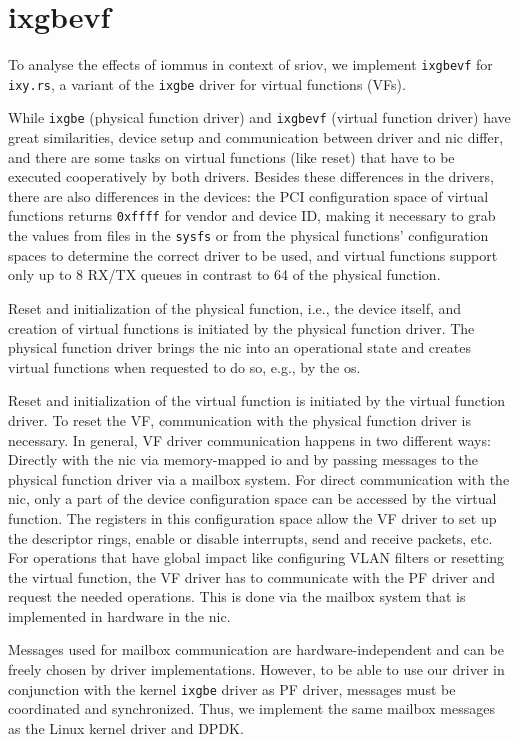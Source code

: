\section{ixgbevf}
\label{sec:ixgbevf}

To analyse the effects of \acp{iommu} in context of \ac{sriov}, we implement
\texttt{ixgbevf} for \texttt{ixy.rs}, a variant of the \texttt{ixgbe} driver for
virtual functions (VFs).

While \texttt{ixgbe} (physical function driver) and \texttt{ixgbevf} (virtual
function driver) have great similarities, device setup and communication between
driver and \ac{nic} differ, and there are some tasks on virtual functions (like
reset) that have to be executed cooperatively by both drivers. Besides these
differences in the drivers, there are also differences in the devices: the PCI
configuration space of virtual functions returns \texttt{0xffff} for vendor and
device ID, making it necessary to grab the values from files in the
\texttt{sysfs} or from the physical functions' configuration spaces to determine
the correct driver to be used, and virtual functions support only up to 8 RX/TX
queues in contrast to 64 of the physical function.

Reset and initialization of the physical function, i.e., the device itself, and
creation of virtual functions is initiated by the physical function driver. The
physical function driver brings the \ac{nic} into an operational state and
creates virtual functions when requested to do so, e.g., by the \ac{os}.

Reset and initialization of the virtual function is initiated by the virtual
function driver. To reset the VF, communication with the physical function
driver is necessary. In general, VF driver communication happens in two
different ways: Directly with the \ac{nic} via memory-mapped \ac{io} and by
passing messages to the physical function driver via a mailbox system. For
direct communication with the \ac{nic}, only a part of the device configuration
space can be accessed by the virtual function. The registers in this
configuration space allow the VF driver to set up the descriptor rings, enable
or disable interrupts, send and receive packets, etc. For operations that have
global impact like configuring VLAN filters or resetting the virtual function,
the VF driver has to communicate with the PF driver and request the needed
operations. This is done via the mailbox system that is implemented in hardware
in the \ac{nic}.

Messages used for mailbox communication are hardware-independent and can be
freely chosen by driver implementations. However, to be able to use our driver
in conjunction with the kernel \texttt{ixgbe} driver as PF driver, messages must
be coordinated and synchronized. Thus, we implement the same mailbox messages as
the Linux kernel driver and DPDK.


